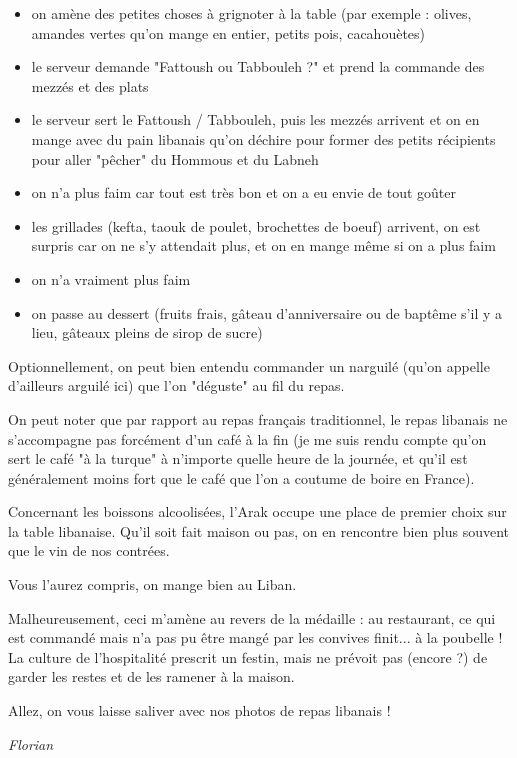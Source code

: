 \begin{itemize}
\tightlist
\item
  on amène des petites choses à grignoter à la table (par exemple :
  olives, amandes vertes qu'on mange en entier, petits pois,
  cacahouètes)
\item
  le serveur demande "Fattoush ou Tabbouleh ?" et prend la commande des
  mezzés et des plats
\item
  le serveur sert le Fattoush / Tabbouleh, puis les mezzés arrivent et
  on en mange avec du pain libanais qu'on déchire pour former des petits
  récipients pour aller "pêcher" du Hommous et du Labneh
\item
  on n'a plus faim car tout est très bon et on a eu envie de tout goûter
\item
  les grillades (kefta, taouk de poulet, brochettes de boeuf) arrivent,
  on est surpris car on ne s'y attendait plus, et on en mange même si on
  a plus faim
\item
  on n'a vraiment plus faim
\item
  on passe au dessert (fruits frais, gâteau d'anniversaire ou de baptême
  s'il y a lieu, gâteaux pleins de sirop de sucre)
\end{itemize}

Optionnellement, on peut bien entendu commander un narguilé (qu'on
appelle d'ailleurs arguilé ici) que l'on "déguste" au fil du repas.

On peut noter que par rapport au repas français traditionnel, le repas
libanais ne s'accompagne pas forcément d'un café à la fin (je me suis
rendu compte qu'on sert le café "à la turque" à n'importe quelle heure
de la journée, et qu'il est généralement moins fort que le café que l'on
a coutume de boire en France).

Concernant les boissons alcoolisées, l'Arak occupe une place de premier
choix sur la table libanaise. Qu'il soit fait maison ou pas, on en
rencontre bien plus souvent que le vin de nos contrées.

Vous l'aurez compris, on mange bien au Liban.

Malheureusement, ceci m'amène au revers de la médaille : au restaurant,
ce qui est commandé mais n'a pas pu être mangé par les convives finit...
à la poubelle ! La culture de l'hospitalité prescrit un festin, mais ne
prévoit pas (encore ?) de garder les restes et de les ramener à la
maison.

Allez, on vous laisse saliver avec nos photos de repas libanais !

\emph{Florian}


